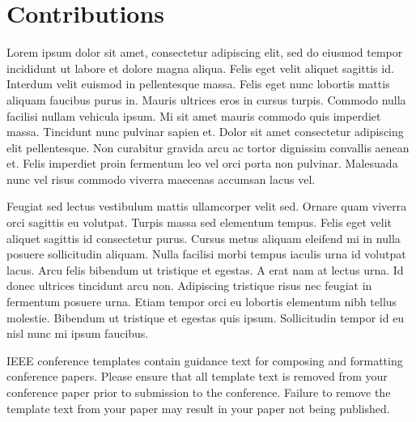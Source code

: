 \documentclass[conference]{IEEEtran}
\begin{document}
\section{Contributions}
Lorem ipsum dolor sit amet, consectetur adipiscing elit, sed do eiusmod tempor incididunt ut labore et dolore magna aliqua. Felis eget velit aliquet sagittis id. Interdum velit euismod in pellentesque massa. Felis eget nunc lobortis mattis aliquam faucibus purus in. Mauris ultrices eros in cursus turpis. Commodo nulla facilisi nullam vehicula ipsum. Mi sit amet mauris commodo quis imperdiet massa. Tincidunt nunc pulvinar sapien et. Dolor sit amet consectetur adipiscing elit pellentesque. Non curabitur gravida arcu ac tortor dignissim convallis aenean et. Felis imperdiet proin fermentum leo vel orci porta non pulvinar. Malesuada nunc vel risus commodo viverra maecenas accumsan lacus vel.

Feugiat sed lectus vestibulum mattis ullamcorper velit sed. Ornare quam viverra orci sagittis eu volutpat. Turpis massa sed elementum tempus. Felis eget velit aliquet sagittis id consectetur purus. Cursus metus aliquam eleifend mi in nulla posuere sollicitudin aliquam. Nulla facilisi morbi tempus iaculis urna id volutpat lacus. Arcu felis bibendum ut tristique et egestas. A erat nam at lectus urna. Id donec ultrices tincidunt arcu non. Adipiscing tristique risus nec feugiat in fermentum posuere urna. Etiam tempor orci eu lobortis elementum nibh tellus molestie. Bibendum ut tristique et egestas quis ipsum. Sollicitudin tempor id eu nisl nunc mi ipsum faucibus.



\vspace{12pt}
\color{red}
IEEE conference templates contain guidance text for composing and formatting conference papers. Please ensure that all template text is removed from your conference paper prior to submission to the conference. Failure to remove the template text from your paper may result in your paper not being published.
\end{document}
